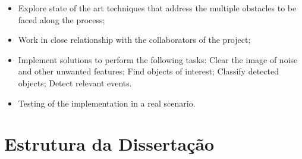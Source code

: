 \begin{itemize}
	\item Explore state of the art techniques that address the multiple obstacles to be faced along the process;
	\item Work in close relationship with the collaborators of the project;
	\item Implement solutions to perform the following tasks:
		\subitem Clear the image of noise and other unwanted features;
		\subitem Find objects of interest;
		\subitem Classify detected objects;
		\subitem Detect relevant events.
	\item Testing of the implementation in a real scenario.
\end{itemize}



\section{Estrutura da Dissertação} \label{sec:struct}


